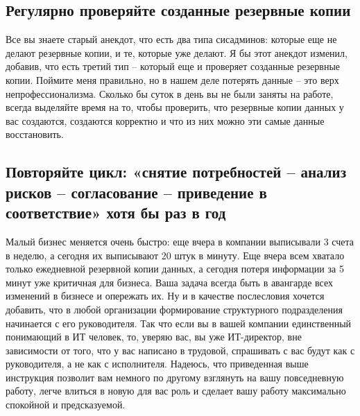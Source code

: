 	\subsection{Регулярно проверяйте созданные резервные копии}
	
	Все вы знаете старый анекдот, что есть два типа сисадминов: которые еще не делают резервные копии, и те, которые уже делают. Я бы этот анекдот изменил, добавив, что есть третий тип – который еще и проверяет созданные резервные копии. Поймите меня правильно, но в нашем деле потерять данные – это верх непрофессионализма. Сколько бы суток в день вы не были заняты на работе, всегда выделяйте время на то, чтобы проверить, что резервные копии данных у вас создаются, создаются корректно и что из них можно эти самые данные восстановить.

    \subsection{Повторяйте цикл: «снятие потребностей – анализ рисков – согласование – приведение в соответствие» хотя бы раз в год}
    
    Малый бизнес меняется очень быстро: еще вчера в компании выписывали 3 счета в неделю, а сегодня их выписывают 20 штук в минуту. Еще вчера всем хватало только ежедневной резервной копии данных, а сегодня потеря информации за 5 минут уже критичная для бизнеса. Ваша задача всегда быть в авангарде всех изменений в бизнесе и опережать их. Ну и в качестве послесловия хочется добавить, что в любой организации формирование структурного подразделения начинается с его руководителя. Так что если вы в вашей компании единственный понимающий в ИТ человек, то, уверяю вас, вы уже ИТ-директор, вне зависимости от того, что у вас написано в трудовой, спрашивать с вас будут как с руководителя, а не как с исполнителя. Надеюсь, что приведенная выше инструкция позволит вам немного по другому взглянуть на вашу повседневную работу, легче влиться в новую для вас роль и сделает вашу работу максимально спокойной и предсказуемой.

	\clearpage

 
